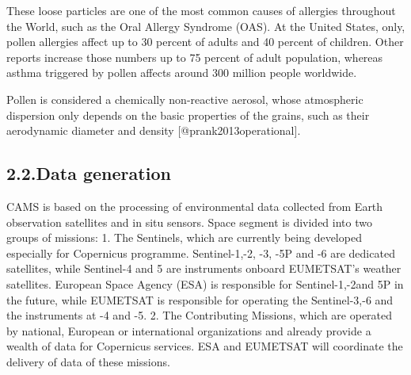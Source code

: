 \documentclass[9pt]{report}
\begin{document}
These loose particles are one of the most common causes of allergies throughout the World, such as the Oral Allergy Syndrome (OAS).
At the United States, only, pollen allergies affect up to 30 percent of adults and 40 percent of children.
Other reports increase those numbers up to 75 percent of adult population, whereas asthma triggered by pollen affects around 300 million people worldwide.%

Pollen is considered a chemically non-reactive aerosol, whose atmospheric dispersion only depends on the basic properties of the grains, such as their aerodynamic diameter and density [@prank2013operational].%

\subsection{2.2.\hspace*{0.5em}Data generation}\label{sec-data-generation}%

\noindent{}CAMS is based on the processing of environmental data collected from Earth observation satellites and in situ sensors.
Space segment is divided into two groups of missions:
1. The Sentinels, which are currently being developed especially for Copernicus programme. Sentinel-1,-2, -3, -5P and -6 are dedicated satellites, while Sentinel-4 and 5 are instruments onboard EUMETSAT’s weather satellites. European Space Agency (ESA) is responsible for Sentinel-1,-2and 5P in the future, while EUMETSAT is responsible for operating the Sentinel-3,-6 and the instruments at -4 and -5.
2. The Contributing Missions, which are operated by national, European or international organizations and already provide a wealth of data for Copernicus services. ESA and EUMETSAT will coordinate the delivery of data of these missions.%
\end{document}
